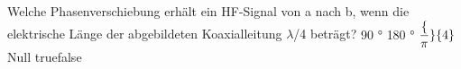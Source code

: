     {Welche Phasenverschiebung erhält ein HF-Signal von a nach b, wenn die elektrische Länge der abgebildeten Koaxialleitung $\lambda$/4 beträgt?}
    {90 °}
    {180 °}
    {$\dfrac\{\pi\}\{4\}$}
    {Null}
    {true}{false}